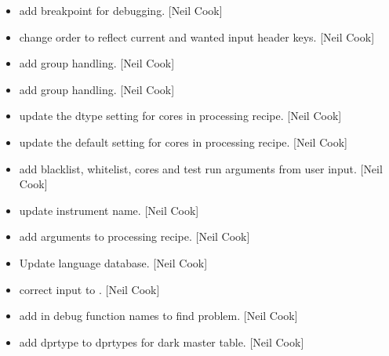 \documentclass[a4paper,10pt,english]{report}
\begin{document}
\begin{itemize}
\item {} 
 \sphinxhyphen{} add breakpoint for debugging.
{[}Neil Cook{]}

\item {} 
 \sphinxhyphen{} change order to reflect
current and wanted input header keys. {[}Neil Cook{]}

\item {} 
 \sphinxhyphen{} add group handling. {[}Neil Cook{]}

\item {} 
 \sphinxhyphen{} add group handling. {[}Neil Cook{]}

\item {} 
 \sphinxhyphen{} update the dtype
setting for \textendash{}cores in processing recipe. {[}Neil Cook{]}

\item {} 
 \sphinxhyphen{} update the default
setting for \textendash{}cores in processing recipe. {[}Neil Cook{]}

\item {} 
 \sphinxhyphen{} add blacklist, whitelist, cores
and test run arguments from user input. {[}Neil Cook{]}

\item {} 
 \sphinxhyphen{} update instrument name. {[}Neil Cook{]}

\item {} 
 \sphinxhyphen{} add arguments to
processing recipe. {[}Neil Cook{]}

\item {} 
Update language database. {[}Neil Cook{]}

\item {} 
 \sphinxhyphen{} correct input to . {[}Neil Cook{]}

\item {} 
 \sphinxhyphen{} add in debug function names to find
problem. {[}Neil Cook{]}

\item {} 
 \sphinxhyphen{} add dprtype to dprtypes for dark master table.
{[}Neil Cook{]}


\end{itemize}
\end{document}
